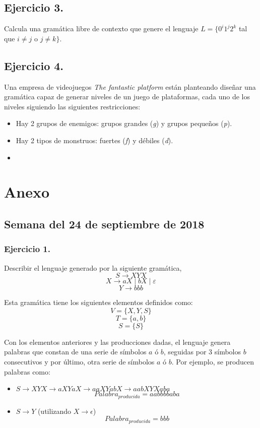 \documentclass[11pt,a4paper]{article}
\begin{document}
\subsection{Ejercicio 3.} Calcula una gramática libre de contexto que genere el lenguaje $L=\{0^i1^j2^k$ tal que $i\not = j$ o $j\not = k\}$.

\subsection{Ejercicio 4.} Una empresa de videojuegos \textit{The fantastic platform} están planteando diseñar una gramática capaz de generar niveles de un juego de plataformas, cada uno de los niveles siguiendo las siguientes restricciones:
	\begin{itemize}
		\item Hay 2 grupos de enemigos: grupos grandes (\textit{g}) y grupos pequeños (\textit{p}).
		\item Hay 2 tipos de monstruos: fuertes (\textit{f}) y débiles (\textit{d}).
		\item
	\end{itemize}

\section{Anexo}
\subsection{Semana del 24 de septiembre de 2018}

\subsubsection{Ejercicio 1.} Describir el lenguaje generado por la siguiente gramática,\\
	\[S\rightarrow XYX \]
	\[X\rightarrow aX \mid bX \mid \varepsilon\]
	\[Y\rightarrow bbb\]
	
Esta gramática tiene los siguientes elementos definidos como:
	\[V=\{X,Y,S\}\]
	\[T=\{a,b\}\]
	\[S=\{S\}\]
	
Con los elementos anteriores y las producciones dadas, el lenguaje genera palabras que constan de una serie de símbolos $a$ ó $b$, seguidas por 3 símbolos $b$ consecutivos y por último, otra serie de símbolos $a$ ó $b$. Por ejemplo, se producen palabras como:

	\begin{itemize}
	\item $S\rightarrow XYX\rightarrow aXYaX\rightarrow aaXYabX \rightarrow aabXYXaba$
	\[Palabra_{producida}=aabbbbaba\]
	\item $S\rightarrow Y$ (utilizando $X\rightarrow \epsilon$)
	\[Palabra_{producida}=bbb\]
	\end{itemize}
	
\end{document}
